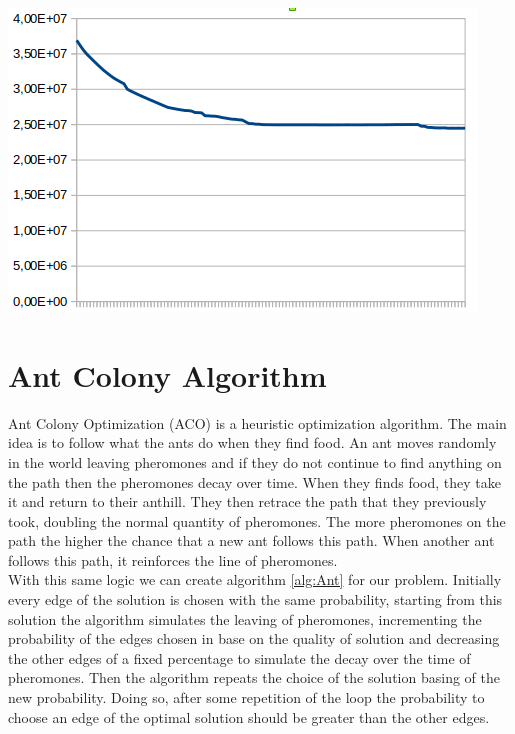 \begin{center}
	\includegraphics[scale=0.3]{Graphics/graph.png}
	\label{img:wfcp}
\end{center}

\section{Ant Colony Algorithm}
Ant Colony Optimization (ACO) is a heuristic optimization algorithm. The main idea is to follow what the ants do when they find food. An ant moves randomly in the world leaving pheromones and if they do not continue to find anything on the path then the pheromones decay over time. When they finds food, they take it and return to their anthill. They then retrace the path that they previously took, doubling the normal quantity of pheromones. The more pheromones on the path the higher the chance that a new ant follows this path. When another ant follows this path, it reinforces the line of pheromones.\\
With this same logic we can create algorithm \ref{alg:Ant} for our problem. Initially every edge of the solution is chosen with the same probability, starting from this solution the algorithm simulates the leaving of pheromones, incrementing the probability of the edges chosen in base on the quality of solution and decreasing the other edges of a fixed percentage to simulate the decay over the time of pheromones. Then the algorithm repeats the choice of the solution basing of the new probability. Doing so, after some repetition of the loop the probability to choose an edge of the optimal solution should be greater than the other edges.\\

